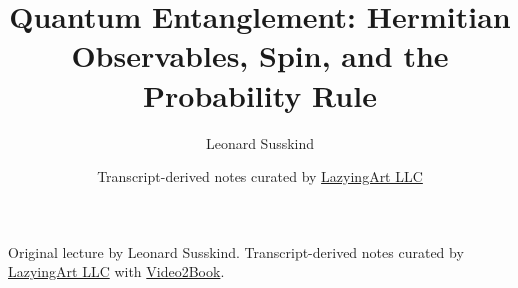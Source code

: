 \documentclass[11pt,oneside]{book}
\begin{document}
\frontmatter
\title{Quantum Entanglement: Hermitian Observables, Spin, and the Probability Rule}
\author{Leonard Susskind}
\date{Transcript-derived notes curated by \href{https://lazying.art}{LazyingArt LLC}}
\maketitle
\begin{center}
\small Original lecture by Leonard Susskind. Transcript-derived notes curated by \href{https://lazying.art}{LazyingArt LLC} with \href{https://github.com/lachlanchen/Video2Book}{Video2Book}.
\end{center}
\clearpage
\mainmatter

\end{document}

